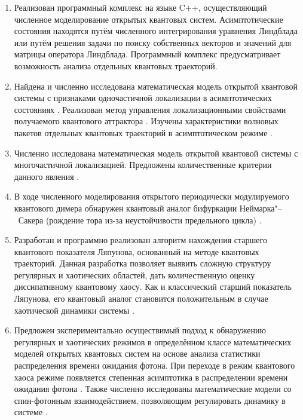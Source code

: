 {}
\begin{enumerate}[beginpenalty=10000] %
	\item Реализован программный комплекс на языке C++, осуществляющий численное моделирование открытых квантовых систем. Асимптотические состояния находятся путём численного интегрирования уравнения Линдблада или путём решения задачи по поиску собственных векторов и значений для матрицы оператора Линдблада. Программный комплекс предусматривает возможность анализа отдельных квантовых траекторий.
	\item Найдена и численно исследована математическая модель открытой квантовой системы с признаками одночастичной локализации в асимптотических состояниях \cite{Yusipov2017}. Реализован метод управления локализационными свойствами получаемого квантового аттрактора \cite{Vershinina2017}. Изучены характеристики волновых пакетов отдельных квантовых траекторий в асимптотическом режиме \cite{Yusipov2018}.
	\item Численно исследована математическая модель открытой квантовой системы с многочастичной локализацией. Предложены количественные критерии данного явления \cite{Vakulchyk2018}.
	\item В ходе численного моделирования открытого периодически модулируемого квантового димера обнаружен квантовый аналог бифуркации Неймарка"--~Сакера (рождение тора из-за неустойчивости предельного цикла) \cite{Yusipov2019_1}.
	\item Разработан и программно реализован \cite{prog1} алгоритм нахождения старшего квантового показателя Ляпунова, основанный на методе квантовых траекторий. Данная разработка позволяет выявить сложную структуру регулярных и хаотических областей, дать количественную оценку диссипативному квантовому хаосу. Как и классический старший показатель Ляпунова, его квантовый аналог становится положительным в случае хаотической динамики системы \cite{Yusipov2019_2}.
	\item Предложен экспериментально осуществимый подход к обнаружению регулярных и хаотических режимов в определённом классе математических моделей открытых квантовых систем на основе анализа статистики распределения времени ожидания фотона. При переходе в режим квантового хаоса режиме появляется степенная асимптотика в распределении времени ожидания фотона \cite{Yusipov2020}. Также численно исследованы математические модели со спин-фотонным взаимодействием, позволяющим регулировать динамику в системе \cite{Yusipov2021}.
\end{enumerate}

